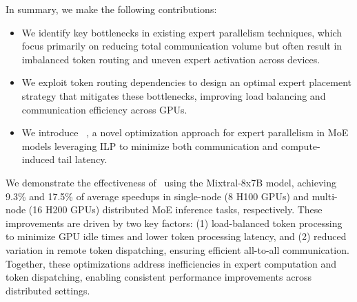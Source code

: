 In summary, we make the following contributions:
\begin{itemize}
    \item We identify key bottlenecks in existing expert parallelism techniques, which focus primarily on reducing total communication volume but often result in imbalanced token routing and uneven expert activation across devices.
    \vspace{-0.5em}
    \item We exploit token routing dependencies to design an optimal expert placement strategy that mitigates these bottlenecks, improving load balancing and communication efficiency across GPUs.
    \vspace{-0.5em}
    \item We introduce \expertune~, a novel optimization approach for expert parallelism in MoE models leveraging ILP to minimize both communication and compute-induced tail latency.
    \vspace{-0.5em}
\end{itemize}

We demonstrate the effectiveness of \expertune~using the Mixtral-8x7B model, achieving 9.3\% and 17.5\% of average speedups in single-node (8 H100 GPUs) and multi-node (16 H200 GPUs) distributed MoE inference tasks, respectively.
%
These improvements are driven by two key factors: (1) load-balanced token processing to minimize GPU idle times and lower token processing latency, and (2) reduced variation in remote token dispatching, ensuring efficient all-to-all communication.
%
Together, these optimizations address inefficiencies in expert computation and token dispatching, enabling consistent performance improvements across distributed settings.

